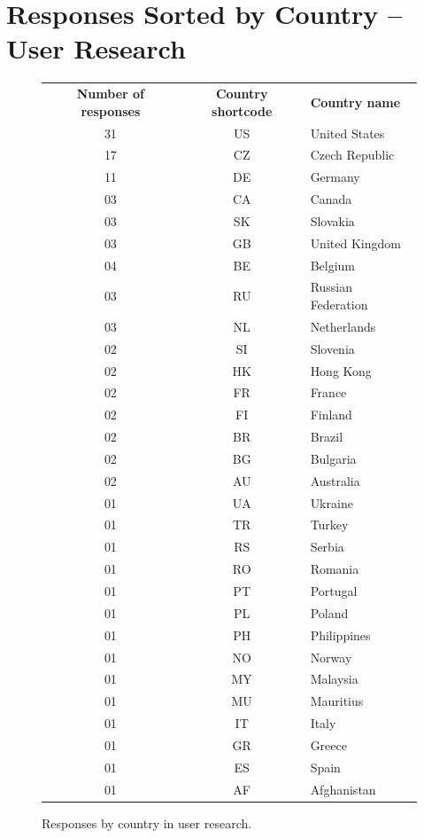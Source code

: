 \documentclass[
  printed, %
  table,   %
  lof,     %
  lot,     %
           oneside, color
]{fithesis3}
\begin{document}
\chapter{Responses Sorted by Country -- User Research}
\vspace{-1em}
\begin{figure}[H]
\center
\begin{footnotesize}
\begin{tabular}{ccl}
\textbf{Number of responses} & \textbf{Country shortcode} & \textbf{Country name} \\
31 & US & United States      \\
17 & CZ & Czech Republic     \\
11 & DE & Germany            \\
03  & CA & Canada             \\
03  & SK & Slovakia           \\
03  & GB & United Kingdom     \\
04  & BE & Belgium            \\
03  & RU & Russian Federation \\
03  & NL & Netherlands        \\
02  & SI & Slovenia           \\
02  & HK & Hong Kong          \\
02  & FR & France             \\
02  & FI & Finland            \\
02  & BR & Brazil             \\
02  & BG & Bulgaria           \\
02  & AU & Australia          \\
01  & UA & Ukraine            \\
01  & TR & Turkey             \\
01  & RS & Serbia             \\
01  & RO & Romania            \\
01  & PT & Portugal           \\
01  & PL & Poland             \\
01  & PH & Philippines        \\
01  & NO & Norway             \\
01  & MY & Malaysia           \\
01  & MU & Mauritius          \\
01  & IT & Italy              \\
01  & GR & Greece             \\
01  & ES & Spain              \\
01  & AF & Afghanistan       
\end{tabular}
\end{footnotesize}
\caption{Responses by country in user research.}
\label{table:countries}
\end{figure}
\end{document}
